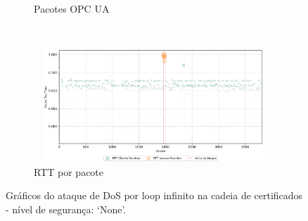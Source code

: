 \begin{apendicesenv}
\begin{figure}[htbp!]
\begin{subfigure}[t]{0.5\textwidth}
        \caption{Pacotes OPC UA}
    \end{subfigure}%
    ~
    \begin{subfigure}[t]{0.5\textwidth}
        \centering
        \includegraphics[width=1\textwidth, height=120pt]{USPSC-img/output/cropped/0-dos_certificate_inf_chain_loop-rttp.png}
        \caption{RTT por pacote}
    \end{subfigure}%
    \label{fig:0-dos_certificate_inf_chain_loop}
    \caption{Gráficos do ataque de DoS por loop infinito na cadeia de certificados - nível de segurança: `None'.}
\end{figure}


\end{apendicesenv}
